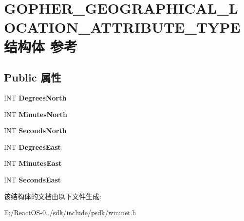 \hypertarget{struct_g_o_p_h_e_r___g_e_o_g_r_a_p_h_i_c_a_l___l_o_c_a_t_i_o_n___a_t_t_r_i_b_u_t_e___t_y_p_e}{}\section{G\+O\+P\+H\+E\+R\+\_\+\+G\+E\+O\+G\+R\+A\+P\+H\+I\+C\+A\+L\+\_\+\+L\+O\+C\+A\+T\+I\+O\+N\+\_\+\+A\+T\+T\+R\+I\+B\+U\+T\+E\+\_\+\+T\+Y\+P\+E结构体 参考}
\label{struct_g_o_p_h_e_r___g_e_o_g_r_a_p_h_i_c_a_l___l_o_c_a_t_i_o_n___a_t_t_r_i_b_u_t_e___t_y_p_e}
\subsection*{Public 属性}
\begin{DoxyCompactItemize}
\item 
\mbox{\label{struct_g_o_p_h_e_r___g_e_o_g_r_a_p_h_i_c_a_l___l_o_c_a_t_i_o_n___a_t_t_r_i_b_u_t_e___t_y_p_e_a95820bc4497b03bba1ef0c347415a4ff}} 
I\+NT {\bfseries Degrees\+North}
\item 
\mbox{\label{struct_g_o_p_h_e_r___g_e_o_g_r_a_p_h_i_c_a_l___l_o_c_a_t_i_o_n___a_t_t_r_i_b_u_t_e___t_y_p_e_a47dcafdd1cd95691404c1b39f465b13b}} 
I\+NT {\bfseries Minutes\+North}
\item 
\mbox{\label{struct_g_o_p_h_e_r___g_e_o_g_r_a_p_h_i_c_a_l___l_o_c_a_t_i_o_n___a_t_t_r_i_b_u_t_e___t_y_p_e_af95b2ec2795cdcb5110767b92e892fcc}} 
I\+NT {\bfseries Seconds\+North}
\item 
\mbox{\label{struct_g_o_p_h_e_r___g_e_o_g_r_a_p_h_i_c_a_l___l_o_c_a_t_i_o_n___a_t_t_r_i_b_u_t_e___t_y_p_e_ac88b1a99bd7927a1867eab3eca24a922}} 
I\+NT {\bfseries Degrees\+East}
\item 
\mbox{\label{struct_g_o_p_h_e_r___g_e_o_g_r_a_p_h_i_c_a_l___l_o_c_a_t_i_o_n___a_t_t_r_i_b_u_t_e___t_y_p_e_a4898a254b6e11b37312b47d192a2f3a7}} 
I\+NT {\bfseries Minutes\+East}
\item 
\mbox{\label{struct_g_o_p_h_e_r___g_e_o_g_r_a_p_h_i_c_a_l___l_o_c_a_t_i_o_n___a_t_t_r_i_b_u_t_e___t_y_p_e_afb08431e69acd07094fc946e088f9c6b}} 
I\+NT {\bfseries Seconds\+East}
\end{DoxyCompactItemize}


该结构体的文档由以下文件生成\+:\begin{DoxyCompactItemize}
\item 
E\+:/\+React\+O\+S-\/0../sdk/include/psdk/wininet.\+h\end{DoxyCompactItemize}
